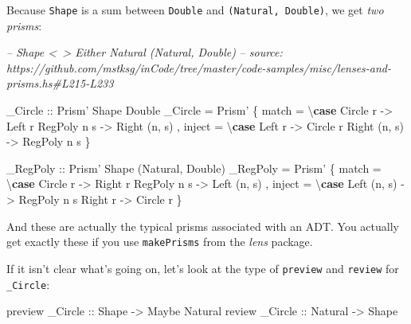 \documentclass[]{article}
\newenvironment{Shaded}{}{}
\newcommand{\CommentTok}[1]{\textcolor[rgb]{0.38,0.63,0.69}{\textit{#1}}}
\newcommand{\DataTypeTok}[1]{\textcolor[rgb]{0.56,0.13,0.00}{#1}}
\newcommand{\FunctionTok}[1]{\textcolor[rgb]{0.02,0.16,0.49}{#1}}
\newcommand{\KeywordTok}[1]{\textcolor[rgb]{0.00,0.44,0.13}{\textbf{#1}}}
\newcommand{\NormalTok}[1]{#1}
\newcommand{\OtherTok}[1]{\textcolor[rgb]{0.00,0.44,0.13}{#1}}
\begin{document}
Because \texttt{Shape} is a sum between \texttt{Double} and
\texttt{(Natural,\ Double)}, we get \emph{two prisms}:

\begin{Shaded}
\begin{Highlighting}[]
\CommentTok{-- Shape <~> Either Natural (Natural, Double)}
\CommentTok{-- source: https://github.com/mstksg/inCode/tree/master/code-samples/misc/lenses-and-prisms.hs#L215-L233}

\OtherTok{_Circle ::} \DataTypeTok{Prism'} \DataTypeTok{Shape} \DataTypeTok{Double}
\NormalTok{_Circle }\FunctionTok{=} \DataTypeTok{Prism'}
\NormalTok{    \{ match  }\FunctionTok{=}\NormalTok{ \textbackslash{}}\KeywordTok{case}
        \DataTypeTok{Circle}\NormalTok{  r    }\OtherTok{->} \DataTypeTok{Left}\NormalTok{ r}
        \DataTypeTok{RegPoly}\NormalTok{ n s  }\OtherTok{->} \DataTypeTok{Right}\NormalTok{ (n, s)}
\NormalTok{    , inject }\FunctionTok{=}\NormalTok{ \textbackslash{}}\KeywordTok{case}
        \DataTypeTok{Left}\NormalTok{   r     }\OtherTok{->} \DataTypeTok{Circle}\NormalTok{ r}
        \DataTypeTok{Right}\NormalTok{ (n, s) }\OtherTok{->} \DataTypeTok{RegPoly}\NormalTok{ n s}
\NormalTok{    \}}

\OtherTok{_RegPoly ::} \DataTypeTok{Prism'} \DataTypeTok{Shape}\NormalTok{ (}\DataTypeTok{Natural}\NormalTok{, }\DataTypeTok{Double}\NormalTok{)}
\NormalTok{_RegPoly }\FunctionTok{=} \DataTypeTok{Prism'}
\NormalTok{    \{ match  }\FunctionTok{=}\NormalTok{ \textbackslash{}}\KeywordTok{case}
        \DataTypeTok{Circle}\NormalTok{  r    }\OtherTok{->} \DataTypeTok{Right}\NormalTok{ r}
        \DataTypeTok{RegPoly}\NormalTok{ n s  }\OtherTok{->} \DataTypeTok{Left}\NormalTok{ (n, s)}
\NormalTok{    , inject }\FunctionTok{=}\NormalTok{ \textbackslash{}}\KeywordTok{case}
        \DataTypeTok{Left}\NormalTok{  (n, s) }\OtherTok{->} \DataTypeTok{RegPoly}\NormalTok{ n s}
        \DataTypeTok{Right}\NormalTok{  r     }\OtherTok{->} \DataTypeTok{Circle}\NormalTok{ r}
\NormalTok{    \}}
\end{Highlighting}
\end{Shaded}

And these are actually the typical prisms associated with an ADT. You actually
get exactly these if you use \texttt{makePrisms} from the \emph{lens} package.

If it isn't clear what's going on, let's look at the type of \texttt{preview}
and \texttt{review} for \texttt{\_Circle}:

\begin{Shaded}
\begin{Highlighting}[]
\NormalTok{preview}\OtherTok{ _Circle ::} \DataTypeTok{Shape}   \OtherTok{->} \DataTypeTok{Maybe} \DataTypeTok{Natural}
\NormalTok{review}\OtherTok{  _Circle ::} \DataTypeTok{Natural} \OtherTok{->} \DataTypeTok{Shape}
\end{Highlighting}
\end{Shaded}
\end{document}
